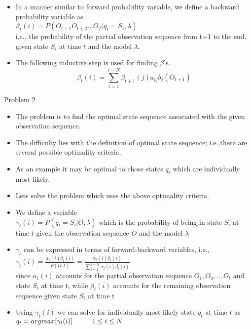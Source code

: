 \documentclass[compress]{beamer}
\begin{document}
\begin{frame}
    \begin{itemize}
    \item In a manner similar to forward probability variable, we define a backward probability variable as\\
    $\beta_t(i)=P(O_{t+1} O_{t+2} ... O_T| q_t=S_i, \lambda)$\\
    i.e., the probability of the partial observation sequence from t+1 to the end, given state $S_i$ at time $t$ and the model $\lambda$.
    \pause \item The following inductive step is used for finding $\beta$'s.
\begin{equation*}
 \beta_{t}(i) = \sum_{i = 1}^{i = N}\beta_{t+1}(j)a_{ij} b_{j}(O_{t+1})
\end{equation*}
    \end{itemize}
\end{frame}

\begin{frame}{Problem 2}
    \begin{itemize}
    \item The problem is to find the optimal state sequence associated with the given observation sequence.
    \item The difficulty lies with the definition of optimal state sequence; i.e.,there are several possible optimality criteria.
    \item As an example it may be optimal to chose states $q_t$ which are individually most likely.
    \end{itemize}
\end{frame}



\begin{frame}
    \begin{itemize}
        \item Lets solve the problem which uses the above optimality criteria.
        \item We define a variable\\
        $\gamma_t(i)=P(q_t=S_i|O,\lambda)$ which is the probability of being in state $S_i$ at time $t$ given the observation sequence $O$ and the model $\lambda$
        \pause \item $\gamma_t$ can be expressed in terms of forward-backward variables, i.e.,\\
        $\gamma_t(i)=\frac{\alpha_t(i) \beta_t(i)}  {P(O|\lambda)}=\frac{\alpha_t(i) \beta_t(i)}{\sum_{i=1}^{i=N}\alpha_t(i) \beta_t(i)}$\\
        since $\alpha_t(i)$ accounts for the partial observation sequence $O_1, O_2, .. , O_t$ and state $S_i$ at time t, while $\beta_t(i)$ accounts for the remaining observation sequence given state $S_i$ at time t
        \pause \item Using $\gamma_t(i)$ we can solve for individually most likely state $q_t$ at time $t$ as\\
        $q_t=argmax [\gamma_t(i)] \hphantom{spaces}  1\leq i \leq N$
    \end{itemize}
\end{frame}
\end{document}
